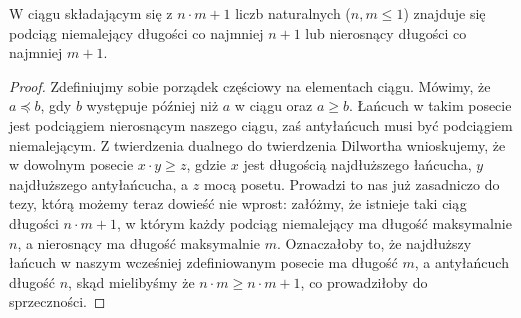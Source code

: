   \begin{theorem}
        W ciągu składającym się z $n \cdot m + 1$ liczb naturalnych ($n,m \leq 1$) znajduje się podciąg niemalejący długości co najmniej $n + 1$ lub nierosnący długości co najmniej $m + 1$. 
    \end{theorem}

    \begin{proof}
       Zdefiniujmy sobie porządek częściowy na elementach ciągu. Mówimy, że $a \preceq b$, gdy $b$ występuje później niż $a$ w ciągu oraz $a \geq b$. Łańcuch w takim posecie jest podciągiem nierosnącym naszego ciągu, zaś antyłańcuch musi być podciągiem niemalejącym. Z twierdzenia dualnego do twierdzenia Dilwortha wnioskujemy, że w dowolnym posecie $x \cdot y \geq z$, gdzie $x$ jest długością najdłuższego łańcucha, $y$ najdłuższego antyłańcucha, a $z$ mocą posetu. Prowadzi to nas już zasadniczo do tezy, którą możemy teraz dowieść nie wprost: załóżmy, że istnieje taki ciąg długości $n \cdot m + 1$, w którym każdy podciąg niemalejący ma długość maksymalnie $n$, a nierosnący ma długość maksymalnie $m$. Oznaczałoby to, że najdłuższy łańcuch w naszym wcześniej zdefiniowanym posecie ma długość $m$, a antyłańcuch długość $n$, skąd mielibyśmy że $n \cdot m \geq n \cdot m + 1$, co prowadziłoby do sprzeczności.
     \end{proof}
  